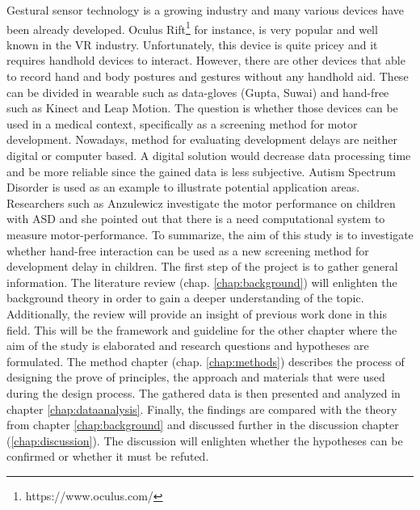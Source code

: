 Gestural sensor technology is a growing industry and many various devices have been already developed. Oculus Rift\footnote{https://www.oculus.com/} for instance, is very popular and well known in the VR industry. Unfortunately, this device is quite pricey and it requires handhold devices to interact. However, there are other devices that able to record hand and body postures and gestures without any handhold aid.
These can be divided in wearable such as data-gloves (Gupta, Suwai) and hand-free such as Kinect and Leap Motion.
The question is whether those devices can be used in a medical context, specifically as a screening method for motor development. Nowadays, method for evaluating development delays are neither digital or computer based. A digital solution would decrease data processing time and be more reliable since the gained data is less subjective. Autism Spectrum Disorder is used as an example to illustrate potential application areas. Researchers such as Anzulewicz investigate the motor performance on children with ASD and she pointed out that there is a need computational system to measure motor-performance. 
\newline
To summarize, the aim of this study is to investigate whether hand-free interaction can be used as a new screening method for development delay in children.
\newline
The first step of the project is to gather general information. The literature review (chap. \ref{chap:background}) will enlighten the background theory in order to gain a deeper understanding of the topic. Additionally, the review will provide an insight of previous work done in this field. This will be the framework and guideline for the other chapter where the aim of the study is elaborated and research questions and hypotheses are formulated. The method chapter (chap. \ref{chap:methods}) describes the process of designing the prove of principles, the approach and materials that were used during the design process. The gathered data is then presented and analyzed in chapter \ref{chap:dataanalysis}. Finally, the findings are compared with the theory from chapter \ref{chap:background} and discussed further in the discussion chapter (\ref{chap:discussion}). The discussion will enlighten whether the hypotheses can be confirmed or whether it must be refuted.




